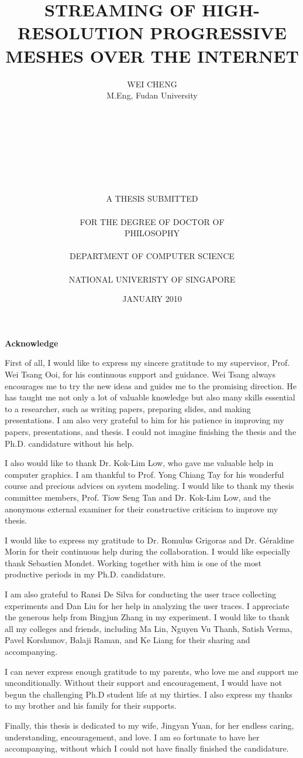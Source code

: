\documentclass[11pt, a4paper]{report}
\date{JANUARY 2010}
\title{STREAMING OF HIGH-RESOLUTION PROGRESSIVE MESHES OVER THE INTERNET}
\author{WEI CHENG\\
M.Eng, Fudan University\\
\\
\\
\\
\\
\\
\\
\\
\\
A THESIS SUBMITTED\\
\\
FOR THE DEGREE OF DOCTOR OF\\
PHILOSOPHY\\
\\
DEPARTMENT OF COMPUTER SCIENCE\\
\\
NATIONAL UNIVERISTY OF SINGAPORE\\
}
\newcommand\acknowledgename{Acknowledge}
\newenvironment{acknowledge}%
    {\cleardoublepage \null \vfill
    \begin{center}%
         \bfseries \acknowledgename
    \end{center}}%
    {\vfill \null}
\begin{document}
\maketitle
\pagestyle{empty}
\cleardoublepage
\pagestyle{plain}
\doublespacing
{}
\begin{acknowledge}
    First of all, I would like to express my sincere gratitude to my supervisor, Prof. Wei Tsang Ooi, for his continuous support and guidance. 
    Wei Tsang always encourages me to try the new ideas and guides me to the promising direction. He has taught me not only a lot of valuable knowledge
    but also many skills essential to a researcher, such as writing papers, preparing slides, and making presentations. 
    I am also very grateful to him for his patience in improving my papers, presentations, and thesis. 
    I could not imagine finishing the thesis and the Ph.D. candidature without his help.

    I also would like to thank Dr. Kok-Lim Low, who gave me valuable help in computer graphics. I am thankful to Prof. Yong Chiang Tay for his
    wonderful course and precious advices on system modeling. I would like to thank my thesis committee members, Prof. Tiow Seng Tan and Dr. Kok-Lim Low, and the anonymous external examiner  
    for their constructive criticism to improve my thesis.

    I would like to express my gratitude to Dr. Romulus Grigoras and Dr. G\'{e}raldine Morin for their continuous help during the collaboration. I would
    like especially thank Sebastien Mondet. Working together with him is one of the most productive periods in my Ph.D. candidature. 

    I am also grateful to Ransi De Silva for conducting the user trace collecting experiments and Dan Liu for her help in analyzing the user traces.
    I appreciate the generous help from Bingjun Zhang in my experiment. 
    I would like to thank all my colleges and friends, including Ma Lin, Nguyen Vu Thanh, Satish Verma, Pavel Korshunov, Balaji Raman, and Ke Liang for their
    sharing and accompanying.

    I can never express enough gratitude to my parents, who love me and support me unconditionally. Without their support and encouragement, I would have not
    begun the challenging Ph.D student life at my thirties. I also express my thanks to my brother and his family for their supports. 
    
    Finally, this thesis is dedicated to my wife, Jingyan Yuan, for her endless caring, understanding, encouragement, and love. I am so fortunate to have her
    accompanying, without which I could not have finally finished the candidature.

\end{acknowledge}
\tableofcontents
   
\listoffigures
\listoftables







\appendix
\end{document}
